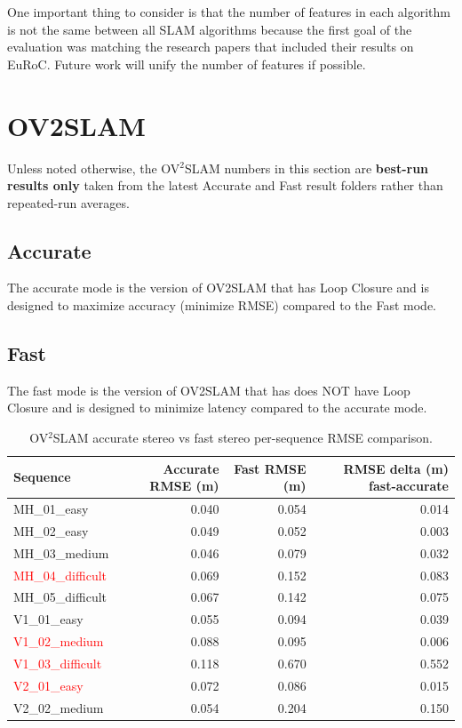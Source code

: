 \documentclass[11pt]{article}
\begin{document}
One important thing to consider is that the number of features in each algorithm is not the same between all SLAM algorithms because the first goal of the evaluation was matching the research papers that included their results on EuRoC. Future work will unify the number of features if possible.

\section{OV2SLAM}

Unless noted otherwise, the OV$^{2}$SLAM numbers in this section are \textbf{best-run results only} taken from the latest Accurate and Fast result folders rather than repeated-run averages.

\subsection{Accurate}

The accurate mode is the version of OV2SLAM that has Loop Closure and is designed to maximize accuracy (minimize RMSE) compared to the Fast mode.

\subsection{Fast}

The fast mode is the version of OV2SLAM that has does NOT have Loop Closure and is designed to minimize latency compared to the accurate mode.


\begin{table}[H]
\centering
\small
\caption{OV$^{2}$SLAM accurate stereo vs fast stereo per-sequence RMSE comparison.}
\label{tab:ov2_accurate_fast_rmse_summary}
\begin{tabular}{lrrr}
\toprule
Sequence & Accurate RMSE (m) & Fast RMSE (m) & RMSE delta (m) fast-accurate \\
\midrule
MH\_01\_easy & 0.040 & 0.054 & 0.014 \\
MH\_02\_easy & 0.049 & 0.052 & 0.003 \\
MH\_03\_medium & 0.046 & 0.079 & 0.032 \\
\textcolor{red}{MH\_04\_difficult} & 0.069 & 0.152 & 0.083 \\
MH\_05\_difficult & 0.067 & 0.142 & 0.075 \\
V1\_01\_easy & 0.055 & 0.094 & 0.039 \\
\textcolor{red}{V1\_02\_medium} & 0.088 & 0.095 & 0.006 \\
\textcolor{red}{V1\_03\_difficult} & 0.118 & 0.670 & 0.552 \\
\textcolor{red}{V2\_01\_easy} & 0.072 & 0.086 & 0.015 \\
V2\_02\_medium & 0.054 & 0.204 & 0.150 \\
\bottomrule
\end{tabular}
\end{table}
\end{document}
